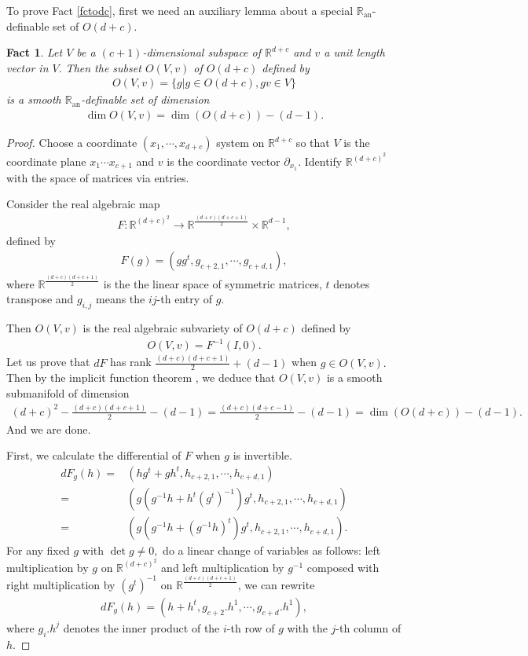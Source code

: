 \documentclass[11pt,a4paper]{amsart}
\numberwithin{equation}{section}
\newcommand{\ran}{\mathbb{R}_{\operatorname{an}}}
\newcommand{\m}{^{-1}}
\newcommand{\pd}{\partial}
\newcommand{\R}{\mathbb{R}}
\theoremstyle{plain}
\newtheorem{fact}{Fact}[subsection]
\theoremstyle{definition}
\numberwithin{equation}{subsection}
\begin{document}
To prove Fact \ref{fctodc}, first we need an auxiliary lemma about a special $\ran$-definable set of $O(d+c).$
\begin{fact}\label{fctovv}
	Let $V$ be a $(c+1)$-dimensional subspace of $\R^{d+c}$ and $v$ a unit length vector in $V.$ Then the subset $O(V,v)$ of $O(d+c)$ defined by
	\begin{align*}
		O(V,v)=\{g|g\in O(d+c),gv\in V\}
	\end{align*}is a smooth $\ran$-definable set of dimension
	\begin{align*}
		\dim O(V,v)=\dim(O(d+c))-(d-1).
	\end{align*}
\end{fact}
\begin{proof}
	Choose a coordinate $(x_1,\cdots,x_{d+c})$ system on $\R^{d+c}$ so that $V$ is the coordinate plane $x_1\cdots x_{c+1}$ and $v$ is the coordinate vector $\pd_{x_1}$. Identify $\R^{(d+c)^2}$ with the space of matrices via entries.
	
	Consider the real algebraic map
	\begin{align*}
		F:\R^{(d+c)^2}\to \R^{\frac{(d+c)(d+c+1)}{2}}\times\R^{d-1},
	\end{align*}
	defined by
	\begin{align*}
		F(g)=(gg^t,g_{c+2,1},\cdots,g_{c+d,1}),
	\end{align*}	where $\R^{\frac{(d+c)(d+c+1)}{2}}$ is the the linear space of symmetric matrices, $t$ denotes transpose and $g_{i,j}$ means the $ij$-th entry of  $g.$ 
	
	Then $O(V,v)$ is the real algebraic subvariety of $O(d+c)$ defined by
	\begin{align*}
O(V,v)=F\m(I,0).
	\end{align*}
	Let us prove that $dF$ has rank $\frac{(d+c)(d+c+1)}{2}+(d-1)$  when $g\in O(V,v).$ Then by the implicit function theorem \cite[Theorem 7.9]{JL}, we deduce that $O(V,v)$ is a smooth submanifold of dimension
	\begin{align*}
		(d+c)^2-\frac{(d+c)(d+c+1)}{2}-(d-1)=\frac{(d+c)(d+c-1)}{2}-(d-1)=\dim(O(d+c))-(d-1).
	\end{align*}And we are done.
	
	
First, we calculate the differential of $F$ when $g$ is invertible.
	\begin{align*}
		dF_g(h)=&(hg^t+gh^t,h_{c+2,1},\cdots,h_{c+d,1})\\=&\left(g(g\m h+h^t(g^t)\m)g^t,h_{c+2,1},\cdots,h_{c+d,1}\right)\\=&\left(g(g\m h+(g\m h)^t)g^t,h_{c+2,1},\cdots,h_{c+d,1}\right).
	\end{align*}
	For any fixed $g$ with $\det g\not=0,$ do a linear change of variables as follows: left multiplication by $g$ on $\R^{(d+c)^2}$ and left multiplication by $g\m$ composed with right multiplication by $(g^t)\m$ on $\R^{\frac{(d+c)(d+c+1)}{2}}$,  we can rewrite
	\begin{align}\label{defndfn}
		dF_g(h)=(h+h^t,g_{c+2}.h^1,\cdots,g_{c+d}.h^1),
	\end{align}where $g_i.h^j$ denotes the inner product of the $i$-th row of $g$ with the $j$-th column of $h.$
	

\end{proof}
\end{document}
